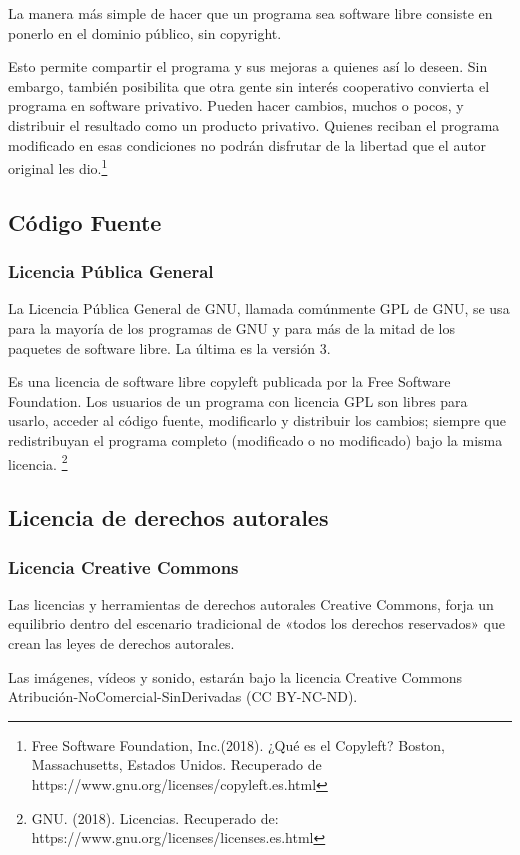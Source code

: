 \documentclass[12pt]{report}%
\begin{document}
La manera más simple de hacer que un programa sea software libre consiste en ponerlo en el dominio público, sin copyright. 

Esto permite compartir el programa y sus mejoras a quienes así lo deseen. Sin embargo, también posibilita que otra gente sin interés cooperativo convierta el programa en software privativo. Pueden hacer cambios, muchos o pocos, y distribuir el resultado como un producto privativo. Quienes reciban el programa modificado en esas condiciones no podrán disfrutar de la libertad que el autor original les dio.\footnote{Free Software Foundation, Inc.(2018). ¿Qué es el Copyleft? Boston, Massachusetts, Estados Unidos. Recuperado de https://www.gnu.org/licenses/copyleft.es.html}


\subsection{Código Fuente}
\subsubsection{Licencia Pública General}

La Licencia Pública General de GNU, llamada comúnmente GPL de GNU, se usa para la mayoría de los programas de GNU y para más de la mitad de los paquetes de software libre. La última es la versión 3. 

Es una licencia de software libre copyleft publicada por la Free Software Foundation. Los usuarios de un programa con licencia GPL son libres para usarlo, acceder al código fuente, modificarlo y distribuir los cambios; siempre que redistribuyan el programa completo (modificado o no modificado) bajo la misma licencia. \footnote{GNU. (2018). Licencias. Recuperado de: https://www.gnu.org/licenses/licenses.es.html }

\subsection{Licencia de derechos autorales}
\subsubsection{Licencia Creative Commons}

Las licencias y herramientas de derechos autorales Creative Commons, forja un equilibrio dentro del escenario tradicional de «todos los derechos reservados» que crean las leyes de derechos autorales.

Las imágenes, vídeos y sonido, estarán bajo la licencia Creative Commons Atribución-NoComercial-SinDerivadas (CC BY-NC-ND).
\end{document}
